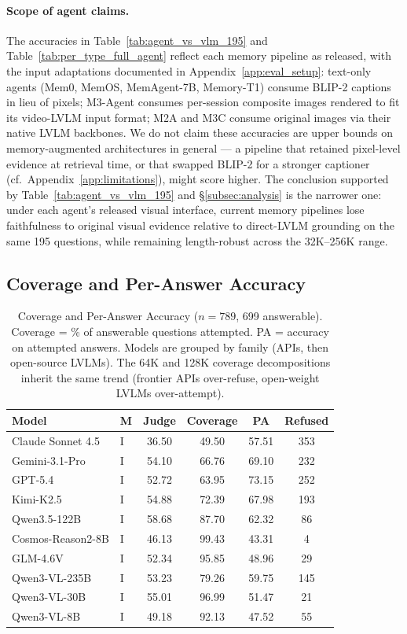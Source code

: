 \documentclass{article}
\begin{document}
\paragraph{Scope of agent claims.}
The accuracies in Table~\ref{tab:agent_vs_vlm_195} and Table~\ref{tab:per_type_full_agent} reflect each memory pipeline as released, with the input adaptations documented in Appendix~\ref{app:eval_setup}: text-only agents (Mem0, MemOS, MemAgent-7B, Memory-T1) consume BLIP-2 captions in lieu of pixels; M3-Agent consumes per-session composite images rendered to fit its video-LVLM input format; M2A and M3C consume original images via their native LVLM backbones. We do not claim these accuracies are upper bounds on memory-augmented architectures in general --- a pipeline that retained pixel-level evidence at retrieval time, or that swapped BLIP-2 for a stronger captioner (cf.\ Appendix~\ref{app:limitations}), might score higher. The conclusion supported by Table~\ref{tab:agent_vs_vlm_195} and \S\ref{subsec:analysis} is the narrower one: under each agent's released visual interface, current memory pipelines lose faithfulness to original visual evidence relative to direct-LVLM grounding on the same 195 questions, while remaining length-robust across the 32K--256K range.

\subsection{Coverage and Per-Answer Accuracy}
\label{app:coverage_full}

\begin{table}[h]
\centering
\caption{Coverage and Per-Answer Accuracy ($n=789$, 699 answerable). Coverage = \% of answerable questions attempted. PA = accuracy on attempted answers. Models are grouped by family (APIs, then open-source LVLMs). The 64K and 128K coverage decompositions inherit the same trend (frontier APIs over-refuse, open-weight LVLMs over-attempt).}
\label{tab:coverage_full}
\small
\begin{tabular}{@{}llcccc@{}}
\toprule
\textbf{Model} & \textbf{M} & \textbf{Judge} & \textbf{Coverage} & \textbf{PA} & \textbf{Refused} \\
\midrule
Claude Sonnet 4.5 & I & 36.50 & 49.50 & 57.51 & 353 \\
Gemini-3.1-Pro & I & 54.10 & 66.76 & 69.10 & 232 \\
GPT-5.4 & I & 52.72 & 63.95 & 73.15 & 252 \\
Kimi-K2.5 & I & 54.88 & 72.39 & 67.98 & 193 \\
\midrule
Qwen3.5-122B & I & 58.68 & 87.70 & 62.32 & 86 \\
\midrule
Cosmos-Reason2-8B & I & 46.13 & 99.43 & 43.31 & 4 \\
\midrule
GLM-4.6V & I & 52.34 & 95.85 & 48.96 & 29 \\
\midrule
Qwen3-VL-235B & I & 53.23 & 79.26 & 59.75 & 145 \\
Qwen3-VL-30B & I & 55.01 & 96.99 & 51.47 & 21 \\
Qwen3-VL-8B & I & 49.18 & 92.13 & 47.52 & 55 \\
\bottomrule
\end{tabular}
\end{table}
\end{document}

